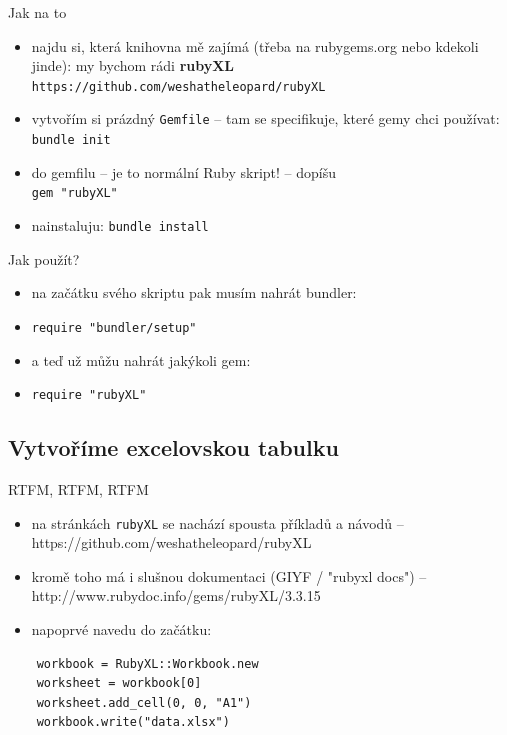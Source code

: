 \documentclass{beamer}
\begin{document}
\begin{frame}{Jak na to}
  \begin{itemize}
    \item najdu si, která knihovna mě zajímá (třeba na rubygems.org nebo kdekoli jinde): my bychom rádi \textbf{rubyXL} \texttt{https://github.com/weshatheleopard/rubyXL}
    \item vytvořím si prázdný \texttt{Gemfile} -- tam se specifikuje, které gemy chci používat: \texttt{bundle init}
    \item do gemfilu -- je to normální Ruby skript! -- dopíšu\\ \texttt{gem "rubyXL"}
    \item nainstaluju: \texttt{bundle install}
  \end{itemize}
\end{frame}

\begin{frame}{Jak použít?}
  \begin{itemize}
    \item na začátku svého skriptu pak musím nahrát bundler:
    \item \texttt{require "bundler/setup"}
    \item a teď už můžu nahrát jakýkoli gem:
    \item \texttt{require "rubyXL"}
  \end{itemize}
\end{frame}

\subsection{Vytvoříme excelovskou tabulku}

\begin{frame}[fragile]{RTFM, RTFM, RTFM}
  \begin{itemize}
    \item na stránkách \texttt{rubyXL} se nachází spousta příkladů a návodů -- https://github.com/weshatheleopard/rubyXL
    \item kromě toho má i slušnou dokumentaci (GIYF / "rubyxl docs") -- http://www.rubydoc.info/gems/rubyXL/3.3.15
    \item napoprvé navedu do začátku:
  \end{itemize}
  {\scriptsize
  \begin{verbatim}
    workbook = RubyXL::Workbook.new
    worksheet = workbook[0]
    worksheet.add_cell(0, 0, "A1")
    workbook.write("data.xlsx")
  \end{verbatim}
  }
\end{frame}
\end{document}
